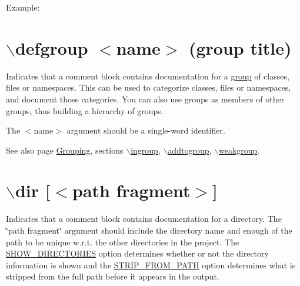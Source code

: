 \begin{DoxyParagraph}{Example:}

 
\end{DoxyParagraph}


 \hypertarget{commands_cmddefgroup}{}\section{$\backslash$defgroup $<$name$>$ (group title)}\label{commands_cmddefgroup}
 Indicates that a comment block contains documentation for a \hyperlink{grouping_modules}{group} of classes, files or namespaces. This can be used to categorize classes, files or namespaces, and document those categories. You can also use groups as members of other groups, thus building a hierarchy of groups.

The $<$name$>$ argument should be a single-\/word identifier.

\begin{DoxySeeAlso}{See also}
page \hyperlink{grouping}{Grouping}, sections \hyperlink{commands_cmdingroup}{$\backslash$ingroup}, \hyperlink{commands_cmdaddtogroup}{$\backslash$addtogroup}, \hyperlink{commands_cmdweakgroup}{$\backslash$weakgroup}.
\end{DoxySeeAlso}


 \hypertarget{commands_cmddir}{}\section{$\backslash$dir \mbox{[}$<$path fragment$>$\mbox{]}}\label{commands_cmddir}
 Indicates that a comment block contains documentation for a directory. The \char`\"{}path fragment\char`\"{} argument should include the directory name and enough of the path to be unique w.r.t. the other directories in the project. The \hyperlink{config_cfg_show_dirs}{SHOW\_\-DIRECTORIES} option determines whether or not the directory information is shown and the \hyperlink{config_cfg_strip_from_path}{STRIP\_\-FROM\_\-PATH} option determines what is stripped from the full path before it appears in the output.



